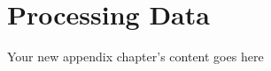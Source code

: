 
\chapter{Processing Data}
\label{appendix:matlab_example}
Your new appendix chapter's content goes here
